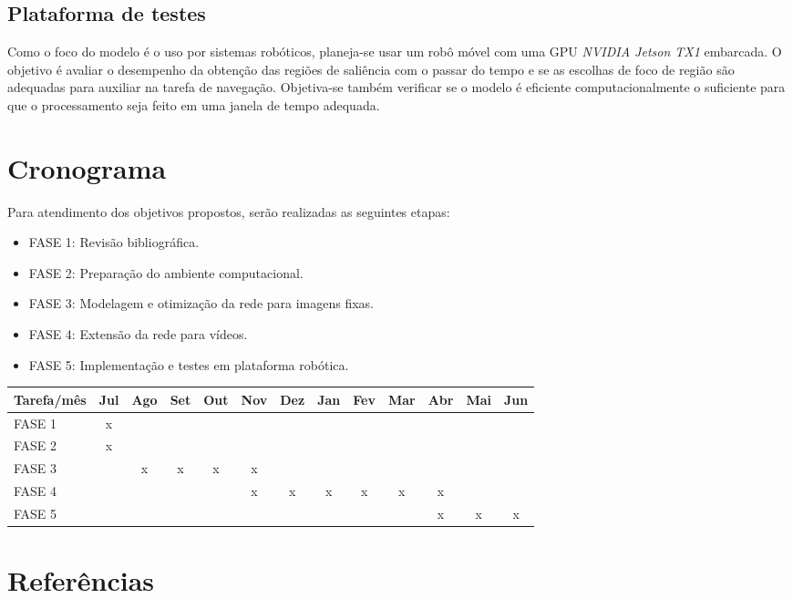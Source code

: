 \documentclass[11pt]{article}
\newcommand{\tit}[1]{\textit{#1}}
\begin{document}
\subsection{Plataforma de testes}
Como o foco do modelo é o uso por sistemas robóticos, planeja-se usar
um robô móvel com uma GPU \tit{NVIDIA Jetson TX1} embarcada.
O objetivo é avaliar o desempenho da obtenção das regiões de saliência
com o passar do tempo e se as escolhas de foco de região são adequadas
para auxiliar na tarefa de navegação.
Objetiva-se também verificar se o modelo é eficiente computacionalmente
o suficiente para que o processamento seja feito em uma janela de tempo
adequada.

\section{Cronograma}
Para atendimento dos objetivos propostos, serão realizadas as seguintes etapas:
\begin{itemize}
	\item FASE 1: Revisão bibliográfica.
	\item FASE 2: Preparação do ambiente computacional.
	\item FASE 3: Modelagem e otimização da rede para imagens fixas.
	\item FASE 4: Extensão da rede para vídeos.
	\item FASE 5: Implementação  e testes em plataforma robótica.
\end{itemize}

\begin{table}[H]
\centering
\setlength{\tabcolsep}{.16667em}
\begin{tabular}{|C{3cm}|c|c|c|c|c|c|c|c|c|c|c|c|}
	\hline
	Tarefa/mês & Jul & Ago & Set & Out & Nov & Dez & Jan & Fev & Mar & Abr
		& Mai & Jun \\
	\hline
	FASE 1 & x & & & & & & & & & & &\\
	\hline
	FASE 2 & x & & & & & & & & & & & \\
	\hline
	FASE 3 & & x & x & x & x & & & & & & &  \\
	\hline
	FASE 4 & & & & & x & x & x & x & x & x & &  \\
	\hline
	FASE 5 & & & & & & & & & & x & x & x \\
	\hline
\end{tabular}
\end{table}

\section{Referências}
\printbibliography
\end{document}

